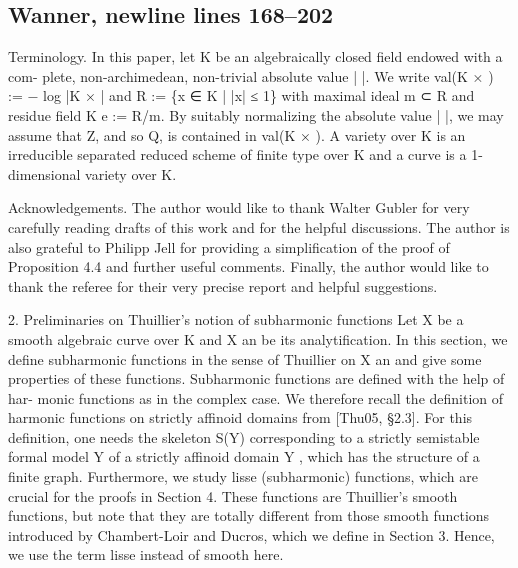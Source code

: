 \documentclass[
  10pt,
]{article}
\newenvironment{Shaded}{}{}
\newcommand{\NormalTok}[1]{#1}
\begin{document}
\subsection{Wanner, newline lines
168--202}\label{wanner-newline-lines-168202}

\begin{Shaded}
\begin{Highlighting}[]
\NormalTok{Terminology. In this paper, let K be an algebraically closed field endowed with a com{-}}
\NormalTok{plete, non{-}archimedean, non{-}trivial absolute value | |. We write val(K × ) := − log |K × |}
\NormalTok{and R := \{x ∈ K | |x| ≤ 1\} with maximal ideal m ⊂ R and residue field K   e := R/m. By}
\NormalTok{suitably normalizing the absolute value | |, we may assume that Z, and so Q, is contained}
\NormalTok{in val(K × ). A variety over K is an irreducible separated reduced scheme of finite type}
\NormalTok{over K and a curve is a 1{-}dimensional variety over K.}

\NormalTok{Acknowledgements. The author would like to thank Walter Gubler for very carefully}
\NormalTok{reading drafts of this work and for the helpful discussions. The author is also grateful}
\NormalTok{to Philipp Jell for providing a simplification of the proof of Proposition 4.4 and further}
\NormalTok{useful comments. Finally, the author would like to thank the referee for their very precise}
\NormalTok{report and helpful suggestions.}


\NormalTok{     2. Preliminaries on Thuillier’s notion of subharmonic functions}
\NormalTok{   Let X be a smooth algebraic curve over K and X an be its analytification. In this}
\NormalTok{section, we define subharmonic functions in the sense of Thuillier on X an and give some}
\NormalTok{properties of these functions. Subharmonic functions are defined with the help of har{-}}
\NormalTok{monic functions as in the complex case. We therefore recall the definition of harmonic}
\NormalTok{functions on strictly affinoid domains from [Thu05, §2.3]. For this definition, one needs}
\NormalTok{the skeleton S(Y) corresponding to a strictly semistable formal model Y of a strictly}
\NormalTok{affinoid domain Y , which has the structure of a finite graph.}
\NormalTok{   Furthermore, we study lisse (subharmonic) functions, which are crucial for the proofs}
\NormalTok{in Section 4. These functions are Thuillier’s smooth functions, but note that they are}
\NormalTok{totally different from those smooth functions introduced by Chambert{-}Loir and Ducros,}
\NormalTok{which we define in Section 3. Hence, we use the term lisse instead of smooth here.}


\end{Highlighting}
\end{Shaded}
\end{document}
